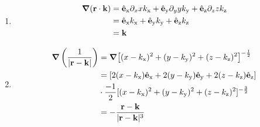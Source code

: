 \documentclass[
    headings=optiontohead,              %
    12pt,                               %
    DIV=13,                             %
    twoside=false,                      %
    open=right,                         %
    BCOR=00mm,                          %
    toc=bibliographynumbered,            %
    parskip=half,                       %
]{scrreprt}
\author{Jan Claar}
\date{\today}
\begin{document}
    \head


    \begin{enumerate}[label=\alph*)]
         \item 
             \begin{align*}
                 \grad(\vb{r}\cdot \vb{k}) &= \hat{\vb{e}}_\mathrm{x}\partial_{x} x k_\mathrm{x} +  \hat{\vb{e}}_\mathrm{y}\partial_{y} y k_\mathrm{y} +\hat{\vb{e}}_\mathrm{z}\partial_{z} z k_\mathrm{z} \\
                &= \hat{\vb{e}}_\mathrm{x}k_\mathrm{x} +  \hat{\vb{e}}_\mathrm{y}k_\mathrm{y} +\hat{\vb{e}}_\mathrm{z} k_\mathrm{z} \\
                &= \vb{k}
             \end{align*}
        \item 
            \begin{align*}
                \grad\left(\frac{1}{|\vb{r}-\vb{k}|}\right) &= \grad[(x -k_\mathrm{x})^2 + (y - k_\mathrm{y})^2 + (z - k_\mathrm{z})^2]^{-\frac{1}{2}} \\
                &= [ 2(x - k_\mathrm{x})\hat{\vb{e}}_\mathrm{x} + 2(y - k_\mathrm{y})\hat{\vb{e}}_\mathrm{y} +2(z - k_\mathrm{z})\hat{\vb{e}}_\mathrm{z}] \\
                &\cdot \frac{-1}{2}[(x -k_\mathrm{x})^2 + (y - k_\mathrm{y})^2 + (z - k_\mathrm{z})^2]^{-\frac{3}{2}} \\
                &= -\displaystyle\frac{\vb{r}- \vb{k}}{|\vb{r} - \vb{k}|^3}
            \end{align*}
    \end{enumerate}    
\end{document}
